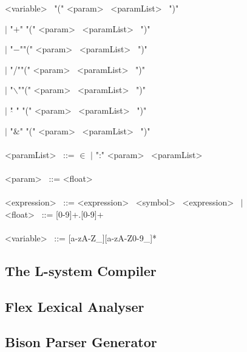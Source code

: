 \hspace{2cm} \textless variable\textgreater~ "("  \textless param\textgreater~ \textless paramList\textgreater~ ")"

\hspace{2cm} $|$ "$+$" "("  \textless param\textgreater~ \textless paramList\textgreater~ ")" 

\hspace{2cm} $|$ "$-$""("  \textless param\textgreater~ \textless paramList\textgreater~ ")" 

\hspace{2cm} $|$ "/""("  \textless param\textgreater~ \textless paramList\textgreater~ ")" 

\hspace{2cm} $|$ "$\backslash$""("  \textless param\textgreater~ \textless paramList\textgreater~ ")" 

\hspace{2cm} $|$ "$\hat{}$ " "("  \textless param\textgreater~ \textless paramList\textgreater~ ")" 

\hspace{2cm} $|$ "$\&$" "("  \textless param\textgreater~ \textless paramList\textgreater~ ")" \\
\\
\textless paramList\textgreater~ ::=  $\in$ $|$ ":" \textless param\textgreater~ \textless paramList\textgreater~ \\
\\
\textless param\textgreater~ ::= \textless float\textgreater~ \\
\\
\textless expression\textgreater~ ::=  \textless expression\textgreater~ \textless symbol\textgreater~ \textless expression\textgreater~ $|$ 
\\
\textless float\textgreater~ ::= [0-9]+.[0-9]+ \\
\\
\textless variable\textgreater~ ::= [a-zA-Z\_][a-zA-Z0-9\_]* \\

\subsection{The L-system Compiler}

\subsection{Flex Lexical Analyser} 

\subsection{Bison Parser Generator}











